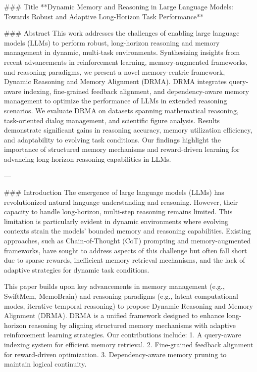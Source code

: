 ### Title
**Dynamic Memory and Reasoning in Large Language Models: Towards Robust and Adaptive Long-Horizon Task Performance**

### Abstract
This work addresses the challenges of enabling large language models (LLMs) to perform robust, long-horizon reasoning and memory management in dynamic, multi-task environments. Synthesizing insights from recent advancements in reinforcement learning, memory-augmented frameworks, and reasoning paradigms, we present a novel memory-centric framework, Dynamic Reasoning and Memory Alignment (DRMA). DRMA integrates query-aware indexing, fine-grained feedback alignment, and dependency-aware memory management to optimize the performance of LLMs in extended reasoning scenarios. We evaluate DRMA on datasets spanning mathematical reasoning, task-oriented dialog management, and scientific figure analysis. Results demonstrate significant gains in reasoning accuracy, memory utilization efficiency, and adaptability to evolving task conditions. Our findings highlight the importance of structured memory mechanisms and reward-driven learning for advancing long-horizon reasoning capabilities in LLMs.

---

### Introduction
The emergence of large language models (LLMs) has revolutionized natural language understanding and reasoning. However, their capacity to handle long-horizon, multi-step reasoning remains limited. This limitation is particularly evident in dynamic environments where evolving contexts strain the models' bounded memory and reasoning capabilities. Existing approaches, such as Chain-of-Thought (CoT) prompting and memory-augmented frameworks, have sought to address aspects of this challenge but often fall short due to sparse rewards, inefficient memory retrieval mechanisms, and the lack of adaptive strategies for dynamic task conditions.

This paper builds upon key advancements in memory management (e.g., SwiftMem, MemoBrain) and reasoning paradigms (e.g., latent computational modes, iterative temporal reasoning) to propose Dynamic Reasoning and Memory Alignment (DRMA). DRMA is a unified framework designed to enhance long-horizon reasoning by aligning structured memory mechanisms with adaptive reinforcement learning strategies. Our contributions include:
1. A query-aware indexing system for efficient memory retrieval.
2. Fine-grained feedback alignment for reward-driven optimization.
3. Dependency-aware memory pruning to maintain logical continuity.

